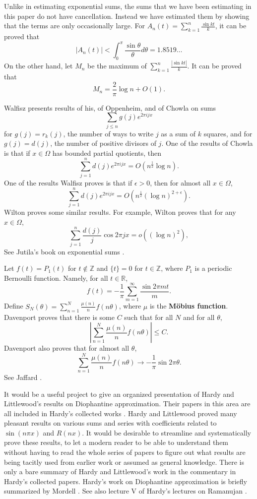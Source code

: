 \documentclass{article}
\begin{document}
Unlike in estimating exponential sums, the sums that we have been estimating
in this paper do not have cancellation. Instead we have estimated
them by showing that the terms are only occasionally large. 
For $A_n(t)=\sum_{k=1}^n \frac{\sin kt}{k}$, it can be proved \cite[p.~74, no.~25]{polyaII} that
\[
|A_n(t)| < \int_0^\pi \frac{\sin \theta}{\theta} d\theta=1.8519\ldots
\]
On the other hand, let $M_n$ be the maximum of $\sum_{k=1}^n \frac{|\sin kt|}{k}$. It can be proved \cite[p.~77, no.~38]{polyaII} that
\[
M_n=\frac{2}{\pi}\log n +O(1).
\]

Walfisz \cite{walfisz} presents results of his, of Oppenheim, and of Chowla  on sums
\[
\sum_{j \leq n} g(j) e^{2\pi i jx}
\]
 for $g(j)=r_k(j)$, the number of ways to write
$j$ as a sum of $k$ squares,  and for $g(j)=d(j)$, the number of positive divisors of $j$. One of the results of Chowla is that  if $x \in \Omega$ has bounded
partial quotients, then
\[
\sum_{j=1}^n d(j) e^{2\pi i jx}=O\left(n^{\frac{1}{2}} \log n \right).
\]
One of the results Walfisz proves is that if $\epsilon>0$, then for almost all $x \in \Omega$,
\[
\sum_{j=1}^n d(j) e^{2\pi ijx}= O\left( n^{\frac{1}{2}} (\log n)^{2+\epsilon} \right).
\]
Wilton \cite{wilton} proves some similar results. For example, Wilton proves that for any $x \in \Omega$, 
\[
\sum_{j=1}^n \frac{d(j)}{j} \cos 2\pi jx = o((\log n)^2),
\]
See Jutila's book on exponential sums \cite{jutila}. 

Let $f(t)=P_1(t)$ for $t \not \in \mathbb{Z}$ and $\{t\}=0$ for $t \in \mathbb{Z}$, where $P_1$ is a periodic
Bernoulli function. Namely, for all $t \in \mathbb{R}$,
\[
f(t) = - \frac{1}{\pi} \sum_{m=1}^\infty \frac{\sin 2\pi mt}{m}.
\]
Define $S_N(\theta) = \sum_{n=1}^N \frac{\mu(n)}{n} f(n\theta)$, where
$\mu$ is the \textbf{M\"obius function}. 
Davenport \cite[p.~11, Theorem 2]{davenport1937} proves that there is some $C$ such that for all $N$ 
and for all $\theta$,
\[
\left| \sum_{n=1}^N \frac{\mu(n)}{n} f(n\theta) \right| \leq C.
\]
Davenport \cite[p.~13, Theorem 4]{davenport1937}  also proves that for almost all $\theta$,
\[
\sum_{n=1}^N \frac{\mu(n)}{n} f(n\theta) \to -\frac{1}{\pi} \sin 2\pi \theta.
\]
See Jaffard \cite{jaffard}.




It would be a useful project to give an organized presentation of Hardy and Littlewood's results on Diophantine approximation. Their papers in this area are all
included in Hardy's collected works \cite{collectedpapers}. Hardy and Littlewood proved many pleasant results on various sums and series with coefficients related
to $\sin(n \pi x)$ and $R(nx)$. It would be desirable to streamline and systematically prove these results, to let a modern reader to be able to understand them without having to 
read the whole series of papers to figure out what results are being tacitly used from earlier work or assumed as general knowledge.
There is only a bare summary of Hardy and Littlewood's work in the commentary in Hardy's collected papers. Hardy's work on Diophantine approximation is briefly summarized by
Mordell \cite{mordell}. See also lecture V of Hardy's lectures on Ramanujan \cite{ramanujan}.
\end{document}
